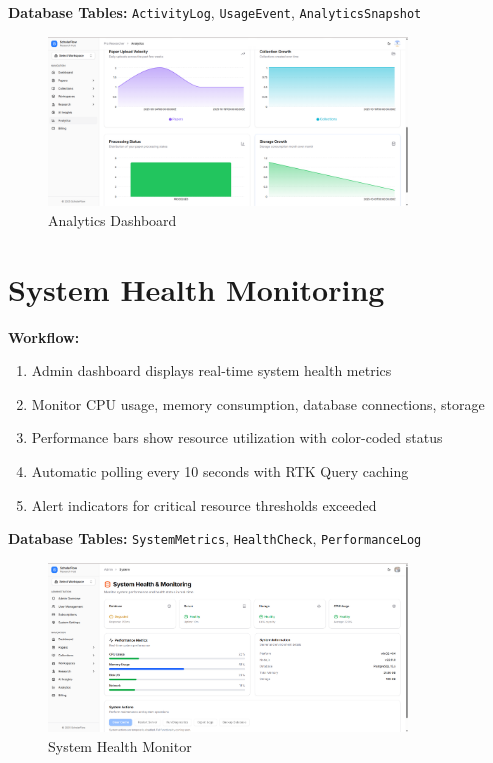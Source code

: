 \textbf{Database Tables:} \texttt{ActivityLog}, \texttt{UsageEvent}, \texttt{AnalyticsSnapshot}

\begin{figure}[H]
\centering
\includegraphics[width=0.85\textwidth]{images/screenshots/analytics.png}
\caption{Analytics Dashboard}
\label{fig:analytics}
\end{figure}

\section{System Health Monitoring}

\textbf{Workflow:}
\begin{enumerate}[leftmargin=*,topsep=3pt,itemsep=2pt]
    \item Admin dashboard displays real-time system health metrics
    \item Monitor CPU usage, memory consumption, database connections, storage
    \item Performance bars show resource utilization with color-coded status
    \item Automatic polling every 10 seconds with RTK Query caching
    \item Alert indicators for critical resource thresholds exceeded
\end{enumerate}

\textbf{Database Tables:} \texttt{SystemMetrics}, \texttt{HealthCheck}, \texttt{PerformanceLog}

\begin{figure}[H]
\centering
\includegraphics[width=0.85\textwidth]{images/screenshots/system_health.png}
\caption{System Health Monitor}
\label{fig:health}
\end{figure}
